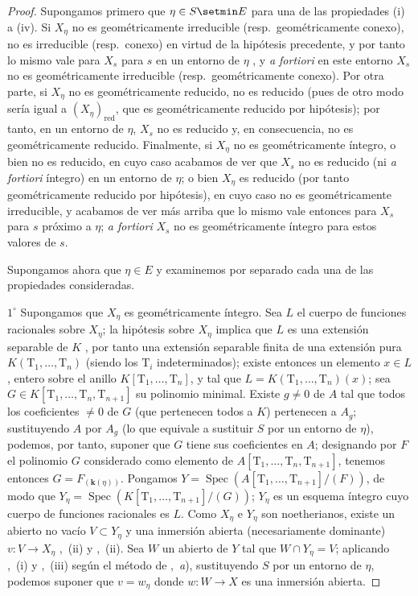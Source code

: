 \begin{proof}
Supongamos primero que $\eta\in S\setmin E$ para una de las propiedades (i) a (iv).
Si $X_\eta$ no es geométricamente irreducible (resp.\ geométricamente conexo), no es irreducible (resp.\ conexo) en virtud de la hipótesis precedente, y por tanto lo mismo vale para $X_s$ para $s$ en un entorno de $\eta$ , y \emph{a fortiori} en este entorno $X_s$ no es geométricamente irreducible (resp.\ geométricamente conexo).
Por otra parte, si $X_\eta$ no es geométricamente reducido, no es reducido (pues de otro modo sería igual a $(X_\eta)_\mathrm{red}$, que es geométricamente reducido por hipótesis); por tanto, en un entorno de $\eta$, $X_s$ no es reducido  y, en consecuencia, no es geométricamente reducido.
Finalmente, si $X_\eta$ no es geométricamente íntegro, o bien no es reducido, en cuyo caso acabamos de ver que $X_s$ no es reducido (ni \emph{a fortiori} íntegro) en un entorno de $\eta$; o bien $X_\eta$ es reducido (por tanto geométricamente reducido por hipótesis), en cuyo caso no es geométricamente irreducible, y acabamos de ver más arriba que lo mismo vale entonces para $X_s$ para $s$ próximo a $\eta$; \emph{a fortiori} $X_s$ no es geométricamente íntegro para estos valores de $s$.

Supongamos ahora que $\eta\in E$ y examinemos por separado cada una de las propiedades consideradas.

$1^\circ$ Supongamos que $X_\eta$ es geométricamente íntegro.
Sea $L$ el cuerpo de funciones racionales sobre $X_\eta$; la hipótesis sobre $X_\eta$ implica que $L$ es una extensión separable de $K$ , por tanto una extensión separable finita de una extensión pura $K(\mathrm{T}_1,\ldots,\mathrm{T}_n)$ (siendo los $\mathrm{T}_i$ indeterminados); existe entonces un elemento $x\in L$, entero sobre el anillo $K[\mathrm{T}_1,\ldots,\mathrm{T}_n]$, y tal que $L=K(\mathrm{T}_1,\ldots,\mathrm{T}_n)(x)$; sea $G\in K[\mathrm{T}_1,\ldots,\mathrm{T}_n,\mathrm{T}_{n+1}]$ su polinomio minimal.
Existe $g\neq 0$ de $A$ tal que todos los coeficientes $\neq 0$ de $G$ (que pertenecen todos a $K$) pertenecen a $A_g$; sustituyendo $A$ por $A_g$ (lo que equivale a sustituir $S$ por un entorno de $\eta$), podemos, por tanto, suponer que $G$ tiene sus coeficientes en $A$; designando por $F$ el polinomio $G$ considerado como elemento de $A[\mathrm{T}_1,\ldots,\mathrm{T}_n,\mathrm{T}_{n+1}]$, tenemos entonces $G=F_{(\mathbf{k}(\eta))}$.
Pongamos $Y=\operatorname{Spec}(A[\mathrm{T}_1,\ldots,\mathrm{T}_{n+1}]/(F))$, de modo que $Y_\eta=\operatorname{Spec}(K[\mathrm{T}_1,\ldots,\mathrm{T}_{n+1}]/(G))$; $Y_\eta$ es un esquema íntegro cuyo cuerpo de funciones racionales es $L$.
Como $X_\eta$ e $Y_\eta$ son noetherianos, existe un abierto no vacío $V\subset Y_\eta$ y una inmersión abierta (necesariamente dominante) $v:V\to X_\eta$ ,~(ii) y ,~(ii).
Sea $W$ un abierto de $Y$ tal que $W\cap Y_\eta=V$; aplicando ,~(i) y ,~(iii) según el método de ,~\emph{a}), sustituyendo $S$ por un entorno de $\eta$, podemos suponer que $v=w_\eta$ donde $w:W\to X$ es una inmersión abierta.


\end{proof}
